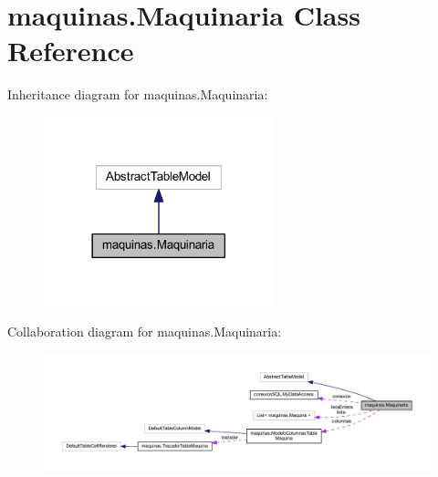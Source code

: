 \hypertarget{classmaquinas_1_1_maquinaria}{}\section{maquinas.\+Maquinaria Class Reference}
\label{classmaquinas_1_1_maquinaria}


Inheritance diagram for maquinas.\+Maquinaria\+:
\nopagebreak
\begin{figure}[H]
\begin{center}
\leavevmode
\includegraphics[width=189pt]{classmaquinas_1_1_maquinaria__inherit__graph}
\end{center}
\end{figure}


Collaboration diagram for maquinas.\+Maquinaria\+:
\nopagebreak
\begin{figure}[H]
\begin{center}
\leavevmode
\includegraphics[width=350pt]{classmaquinas_1_1_maquinaria__coll__graph}
\end{center}
\end{figure}

